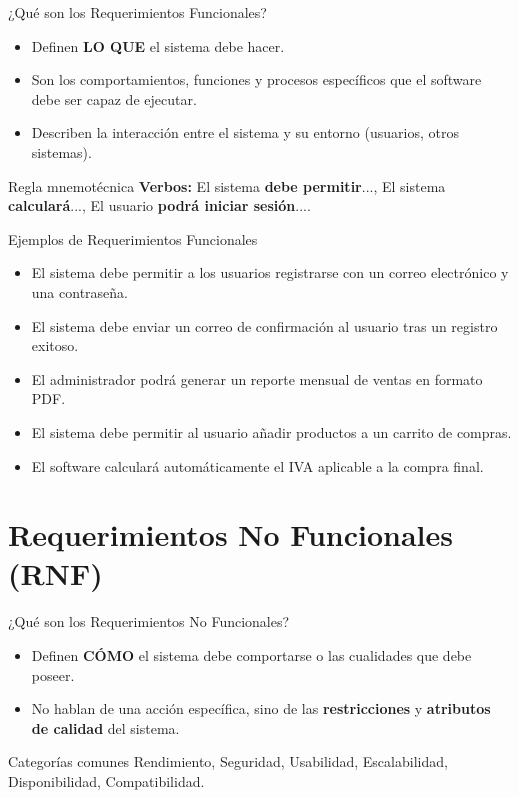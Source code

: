 \documentclass{beamer}
\begin{document}
\begin{frame}{¿Qué son los Requerimientos Funcionales?}
    \begin{itemize}
        \item Definen \textbf{LO QUE} el sistema debe hacer.
        \item Son los comportamientos, funciones y procesos específicos que el software debe ser capaz de ejecutar.
        \item Describen la interacción entre el sistema y su entorno (usuarios, otros sistemas).
    \end{itemize}
    \vspace{0.3cm}
    \begin{block}{Regla mnemotécnica}
    \textbf{Verbos:} El sistema \textbf{debe permitir}..., El sistema \textbf{calculará}..., El usuario \textbf{podrá iniciar sesión}....
    \end{block}
\end{frame}

\begin{frame}{Ejemplos de Requerimientos Funcionales}
    \begin{itemize}
        \item El sistema debe permitir a los usuarios registrarse con un correo electrónico y una contraseña.
        \item El sistema debe enviar un correo de confirmación al usuario tras un registro exitoso.
        \item El administrador podrá generar un reporte mensual de ventas en formato PDF.
        \item El sistema debe permitir al usuario añadir productos a un carrito de compras.
        \item El software calculará automáticamente el IVA aplicable a la compra final.
    \end{itemize}
\end{frame}

\section{Requerimientos No Funcionales (RNF)}

\begin{frame}{¿Qué son los Requerimientos No Funcionales?}
    \begin{itemize}
        \item Definen \textbf{CÓMO} el sistema debe comportarse o las cualidades que debe poseer.
        \item No hablan de una acción específica, sino de las \textbf{restricciones} y \textbf{atributos de calidad} del sistema.
    \end{itemize}
    \vspace{0.3cm}
    \begin{block}{Categorías comunes}
    Rendimiento, Seguridad, Usabilidad, Escalabilidad, Disponibilidad, Compatibilidad.
    \end{block}
\end{frame}
\end{document}
